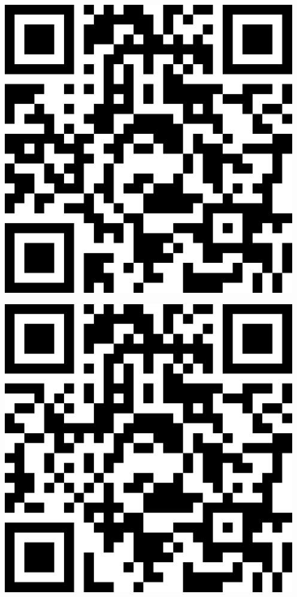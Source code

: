 \documentclass[letterpaper]{article}
\begin{document}
 
 \vspace*{\fill} 
 \begingroup 
 \centerline{\includegraphics[scale=1,width=5in,height=5in]{BreakOutRoom2.png}} 
 \endgroup 
 \vspace*{\fill} 
 \pagebreak 
{} 
 \vspace*{\fill} 
 \begingroup 
 \centerline{\includegraphics[scale=1,width=5in,height=5in]{BreakOutRoom3.png}} 
\end{document}

